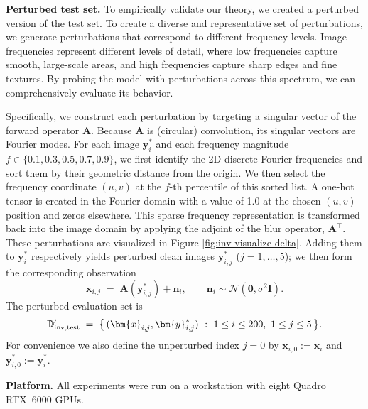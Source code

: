 \documentclass{amsart} %
\def\vzero{{\bm{0}}}
\def\vn{{\bm{n}}}
\def\vx{{\bm{x}}}
\def\vy{{\bm{y}}}
\def\mA{{\bm{A}}}
\def\mI{{\bm{I}}}
\def\sD{{\mathbb{D}}}
\def\cN{{\mathcal{N}}}
\theoremstyle{definition}
\theoremstyle{remark}
\begin{document}
\textbf{Perturbed test set.} To empirically validate our theory, we created a perturbed version of the test set. To create a diverse and representative set of perturbations, we generate perturbations that correspond to different frequency levels. Image frequencies represent different levels of detail, where low frequencies capture smooth, large-scale areas, and high frequencies capture sharp edges and fine textures. By probing the model with perturbations across this spectrum, we can comprehensively evaluate its behavior.

Specifically, we construct each perturbation by targeting a singular vector of the forward operator $\mA$. Because \(\mA\) is (circular) convolution, its singular vectors are Fourier modes. For each image \(\vy^\ast_i\) and each frequency magnitude \(f\in\{0.1,0.3,0.5,0.7,0.9\}\), we first identify the 2D discrete Fourier frequencies and sort them by their geometric distance from the origin. We then select the frequency coordinate $(u,v)$ at the $f$-th percentile of this sorted list. A one-hot tensor is created in the Fourier domain with a value of 1.0 at the chosen $(u,v)$ position and zeros elsewhere. This sparse frequency representation is transformed back into the image domain by applying the adjoint of the blur operator, $\mA^\top$. These perturbations are visualized in Figure \ref{fig:inv-visualize-delta}. Adding them to \(\vy_i^\ast\) respectively yields perturbed clean images \(\vy_{i,j}^\ast\) (\(j=1,\dots,5\)); we then form the corresponding observation
\[
\vx_{i,j} \;=\; \mA(\vy_{i,j}^\ast) + \vn_{i},\qquad \vn_{i}\sim\cN(\vzero,\sigma^2 \mI).
\]
The perturbed evaluation set is
\[
\sD'_{\textup{inv,test}}
\;=\;
\big\{\,(\vx_{i,j},\vy_{i,j}^\ast)\ :\ 1\le i\le 200,\ 1\le j\le 5\,\big\}.
\]
For convenience we also define the unperturbed index \(j=0\) by \(\vx_{i,0}:=\vx_i\) and \(\vy_{i,0}^\ast:=\vy_i^\ast\).

\textbf{Platform.}
All experiments were run on a workstation with eight Quadro RTX~6000 GPUs.
\end{document}
